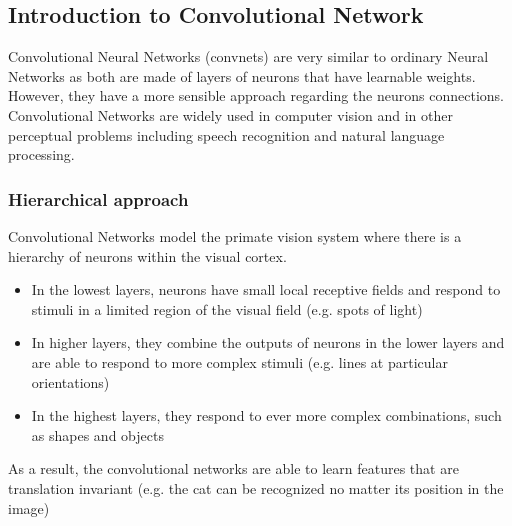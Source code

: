 \documentclass[a4paper,10pt]{article}
\begin{document}
 
 \subsection{Introduction to Convolutional Network}
 
 \quad Convolutional Neural Networks (convnets) are very similar to ordinary Neural Networks as both are made of layers of neurons that have learnable weights. However, they have a more sensible approach regarding the neurons connections. Convolutional Networks are widely used in computer vision and in other perceptual problems including speech recognition and natural language processing.  
 \subsubsection{Hierarchical approach }
 
 \quad Convolutional Networks model the primate vision system where there is a hierarchy of neurons within the visual cortex.
 \begin{itemize}
 	
 \item In the lowest layers,
 neurons have small local receptive fields and respond to stimuli in a limited region of the visual field (e.g. spots of light)
 
 \item In higher layers,
 they combine the outputs of neurons in the lower layers and are able to respond to more complex stimuli (e.g. lines at particular orientations)
 
 \item In the highest layers,
 they respond to ever more complex combinations, such as shapes and objects
  \end{itemize}

	
	\quad As a result, the convolutional networks are able to learn features that are translation invariant (e.g. the cat can be recognized no matter its position in the image)
\end{document}
